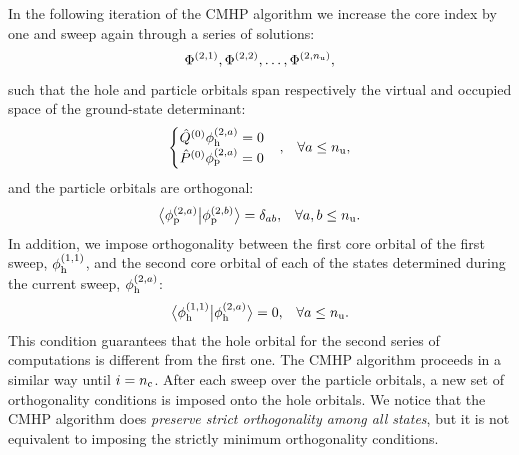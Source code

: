 \documentclass[12pt]{article}
\newcommand{\braket}[3][0]
{\ifthenelse{\equal{#1}{0}}{\left\langle #2 \middle| #3 \right\rangle}
{\ifthenelse{\equal{#1}{1}}{\big\langle #2 \big| #3 \big\rangle}
{\ifthenelse{\equal{#1}{2}}{\Big\langle #2 \Big| #3 \Big\rangle}
{\ifthenelse{\equal{#1}{3}}{\bigg\langle #2 \bigg| #3 \bigg\rangle}
{\ifthenelse{\equal{#1}{4}}{\Bigg\langle #2 \Bigg| #3 \Bigg\rangle}
{Error}}}}}
}
\begin{document}
In the following iteration of the CMHP algorithm we increase the core index by one and sweep again through a series of solutions:
\begin{equation}
\Phi^{(2,1)}, \Phi^{(2,2)}, \ldots, \Phi^{(2,n_{\rm u})},
\end{equation}
such that the hole and particle orbitals span respectively the virtual and occupied space of the ground-state determinant:
\begin{align}
\begin{cases}
\hat{Q}^{(0)}\phi_{\rm h}^{(2,a)}= 0\\
\hat{P}^{(0)}\phi_{\rm p}^{(2,a)}= 0
\end{cases} &,&\forall a \leq n_{\rm u},
\end{align}
and the particle orbitals are orthogonal:
\begin{align}
\braket[1]{\phi^{(2,a)}_{\rm p}}{\phi^{(2,b)}_{\rm p}} &= \delta_{ab},&\forall a,b \leq n_{\rm u}.
\end{align}
In addition, we impose orthogonality between the first core orbital of the first sweep, $\phi^{(1,1)}_{\rm h}$, and the second core orbital of each of the states determined during the current sweep, $\phi^{(2,a)}_{\rm h}$:
\begin{align}
\braket[1]{\phi^{(1,1)}_{\rm h}}{\phi^{(2,a)}_{\rm h}} &=0,&\forall a \leq n_{\rm u}.
\end{align}
This condition guarantees that the hole orbital for the second series of computations is different from the first one.
The CMHP algorithm proceeds in a similar way until $i = n_{\rm c}$.  After each sweep over the particle orbitals, a new set of orthogonality conditions is imposed onto the hole orbitals.
We notice that the CMHP algorithm does \textit{preserve strict orthogonality among all states}, but it is not equivalent to imposing the strictly minimum orthogonality conditions.
\end{document}
